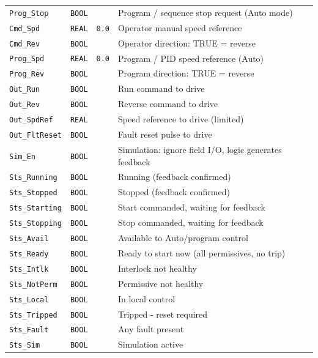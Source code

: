 {\begin{longtable}{@{}>{\raggedright\arraybackslash}p{3.4cm}>{\raggedright\arraybackslash}p{3.3cm}>{\raggedright\arraybackslash}p{1.3cm}>{\raggedright\arraybackslash}p{6.4cm}@{}}
\texttt{Prog\_Stop} & \texttt{BOOL} &  & Program /\allowbreak{} sequence stop request (Auto mode) \\
\texttt{Cmd\_Spd} & \texttt{REAL} & \texttt{0.0} & Operator manual speed reference \\
\texttt{Cmd\_Rev} & \texttt{BOOL} &  & Operator direction: TRUE = reverse \\
\texttt{Prog\_Spd} & \texttt{REAL} & \texttt{0.0} & Program /\allowbreak{} PID speed reference (Auto) \\
\texttt{Prog\_Rev} & \texttt{BOOL} &  & Program direction: TRUE = reverse \\
\texttt{Out\_Run} & \texttt{BOOL} &  & Run command to drive \\
\texttt{Out\_Rev} & \texttt{BOOL} &  & Reverse command to drive \\
\texttt{Out\_SpdRef} & \texttt{REAL} &  & Speed reference to drive (limited) \\
\texttt{Out\_FltReset} & \texttt{BOOL} &  & Fault reset pulse to drive \\
\texttt{Sim\_En} & \texttt{BOOL} &  & Simulation: ignore field I/\allowbreak{}O, logic generates feedback \\
\texttt{Sts\_Running} & \texttt{BOOL} &  & Running (feedback confirmed) \\
\texttt{Sts\_Stopped} & \texttt{BOOL} &  & Stopped (feedback confirmed) \\
\texttt{Sts\_Starting} & \texttt{BOOL} &  & Start commanded, waiting for feedback \\
\texttt{Sts\_Stopping} & \texttt{BOOL} &  & Stop commanded, waiting for feedback \\
\texttt{Sts\_Avail} & \texttt{BOOL} &  & Available to Auto/\allowbreak{}program control \\
\texttt{Sts\_Ready} & \texttt{BOOL} &  & Ready to start now (all permissives, no trip) \\
\texttt{Sts\_Intlk} & \texttt{BOOL} &  & Interlock not healthy \\
\texttt{Sts\_NotPerm} & \texttt{BOOL} &  & Permissive not healthy \\
\texttt{Sts\_Local} & \texttt{BOOL} &  & In local control \\
\texttt{Sts\_Tripped} & \texttt{BOOL} &  & Tripped - reset required \\
\texttt{Sts\_Fault} & \texttt{BOOL} &  & Any fault present \\
\texttt{Sts\_Sim} & \texttt{BOOL} &  & Simulation active \\

\end{longtable}}
